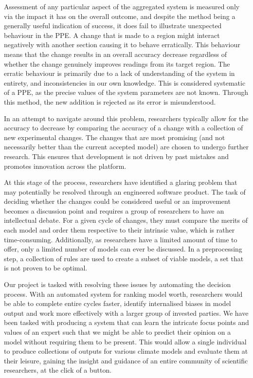 \documentclass{ecmm427_assignment}
\begin{document}
 Assessment of any particular aspect of the aggregated system is measured only via the impact it has on the overall outcome, and despite the method being a generally useful indication of success, it does fail to illustrate unexpected behaviour in the PPE. A change that is made to a region might interact negatively with another section causing it to behave erratically. This behaviour means that the change results in an overall accuracy decrease regardless of whether the change genuinely improves readings from its target region. The erratic behaviour is primarily due to a lack of understanding of the system in entirety, and inconsistencies in our own knowledge. This is considered systematic of a PPE, as the precise values of the system parameters are not known. Through this method, the new addition is rejected as its error is misunderstood.

 In an attempt to navigate around this problem, researchers typically allow for the accuracy to decrease by comparing the accuracy of a change with a collection of new experimental changes. The changes that are most promising (and not necessarily better than the current accepted model) are chosen to undergo further research. This ensures that development is not driven by past mistakes and promotes innovation across the platform.

 At this stage of the process, researchers have identified a glaring problem that may potentially be resolved through an engineered software product. The task of deciding whether the changes could be considered useful or an improvement becomes a discussion point and requires a group of researchers to have an intellectual debate. For a given cycle of changes, they must compare the merits of each model and order them respective to their intrinsic value, which is rather time-consuming. Additionally, as researchers have a limited amount of time to offer, only a limited number of models can ever be discussed. In a preprocessing step, a collection of rules are used to create a subset of viable models, a set that is not proven to be optimal.

 Our project is tasked with resolving these issues by automating the decision process. With an automated system for ranking model worth, researchers would be able to complete entire cycles faster, identify internalised biases in model output and work more effectively with a larger group of invested parties. We have been tasked with producing a system that can learn the intricate focus points and values of an expert such that we might be able to predict their opinion on a model without requiring them to be present. This would allow a single individual to produce collections of outputs for various climate models and evaluate them at their leisure, gaining the insight and guidance of an entire community of scientific researchers, at the click of a button.
\end{document}
